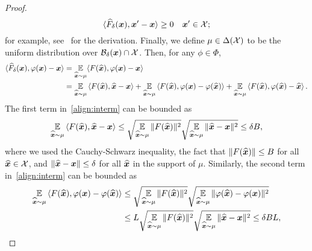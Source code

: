 \begin{proof}
    \begin{equation*}
        \langle \widehat{F}_\delta({\bm{x}}), {\bm{x}}' - {\bm{x}} \rangle \geq 0 \quad {\bm{x}}' \in {\mathcal{X}};
    \end{equation*}
    for example, see~\citet[Section 3]{Kinderlehrer00:Introduction} for the derivation. Finally, we define $\mu \in \Delta({\mathcal{X}})$ to be the uniform distribution over ${\mathcal{B}}_{\delta}({\bm{x}}) \cap {\mathcal{X}}$. Then, for any $\phi \in \Phi$,
    \begin{align}
        \langle \hatF_\delta(\vx), \phi(\vx) - \vx \rangle &= \E_{\hatvx \sim \mu} \langle F(\hatvx), \phi(\vx) - \vx \rangle \notag \\
        &= \E_{\hatvx \sim \mu} \ip{F(\hatvx), \hatvx - \vx} + \E_{\hatvx \sim \mu} \ip{F(\hatvx),  \phi(\vx) - \phi(\hatvx)}  + \E_{\hatvx \sim \mu} \ip{F(\hatvx), \phi(\hatvx) - \hatvx}. \label{align:interm}
    \end{align}
    The first term in~\eqref{align:interm} can be bounded as
    \begin{equation}
        \label{eq:firstineq}
        \E_{\hatvx \sim \mu} \ip{F(\hatvx), \hatvx - \vx} \leq \sqrt{\E_{\hatvx \sim \mu} \| F(\hatvx) \|^2} \sqrt{\E_{\hatvx \sim \mu} \| \hatvx - \vx \|^2} \leq \delta B,
    \end{equation}
    where we used the Cauchy-Schwarz inequality, the fact that $\| F(\widehat{{\bm{x}}}) \| \leq B$ for all $\widehat{{\bm{x}}} \in {\mathcal{X}}$, and $\| \widehat{{\bm{x}}} - {\bm{x}} \| \leq \delta$ for all $\widehat{{\bm{x}}}$ in the support of $\mu$. Similarly, the second term in~\eqref{align:interm} can be bounded as
    \begin{align}
        \E_{\hatvx \sim \mu} \ip{F(\hatvx), \phi(\vx) - \phi(\hatvx) } &\leq \sqrt{\E_{\hatvx \sim \mu} \| F(\hatvx) \|^2} \sqrt{\E_{\hatvx \sim \mu} \| \phi(\hatvx) - \phi(\vx) \|^2} \notag \\
        &\leq L \sqrt{\E_{\hatvx \sim \mu} \| F(\hatvx) \|^2} \sqrt{\E_{\hatvx \sim \mu} \| \hatvx - \vx \|^2} \leq \delta B L, \label{eq:secondineq}

\end{align}
\end{proof}
